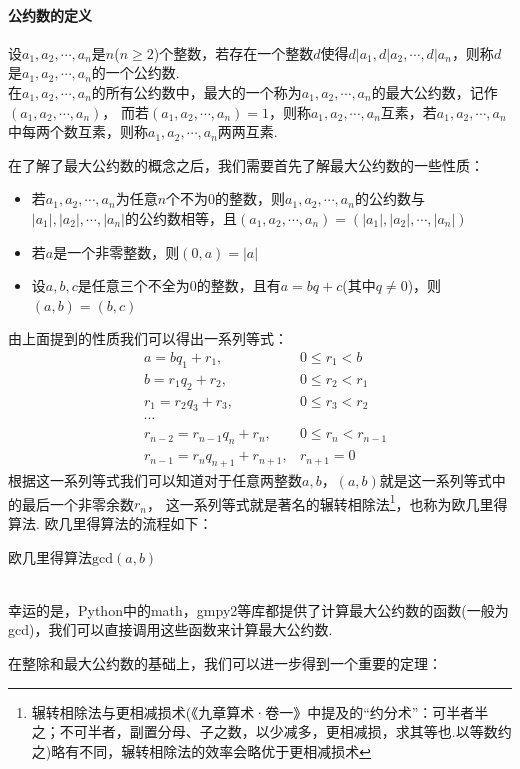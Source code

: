 \documentclass{book}
\numberwithin{equation}{subsubsection}
\begin{document}
\paragraph{\textbf{公约数的定义}}
设$a_1, a_2,\cdots,a_n$是$n$($n\ge2$)个整数，若存在一个整数$d$使得$d|a_1,d|a_2,\cdots,d|a_n$，则称$d$是$a_1,a_2,\cdots,a_n$的一个公约数.\\
在$a_1, a_2,\cdots,a_n$的所有公约数中，最大的一个称为$a_1, a_2,\cdots,a_n$的最大公约数，记作$(a_1,a_2,\cdots,a_n)$，
而若$(a_1,a_2,\cdots,a_n)=1$，则称$a_1, a_2,\cdots,a_n$互素，若$a_1, a_2,\cdots,a_n$中每两个数互素，则称$a_1, a_2,\cdots,a_n$两两互素.\par
在了解了最大公约数的概念之后，我们需要首先了解最大公约数的一些性质：
\begin{itemize}
    \item 若$a_1,a_2,\cdots,a_n$为任意$n$个不为$0$的整数，则$a_1,a_2,\cdots,a_n$的公约数与$|a_1|,|a_2|,\cdots,|a_n|$的公约数相等，且$(a_1,a_2,\cdots,a_n)=(|a_1|,|a_2|,\cdots,|a_n|)$
    \item 若$a$是一个非零整数，则$(0,a)=|a|$
    \item 设$a,b,c$是任意三个不全为$0$的整数，且有$a=bq+c$(其中$q\neq0$)，则$(a,b)=(b,c)$
\end{itemize}
由上面提到的性质我们可以得出一系列等式：
\begin{equation}
\begin{aligned}
    &a=bq_1+r_1,&0\leq r_1 < b\\
    &b=r_1q_2+r_2,&0\leq r_2 < r_1\\
    &r_1=r_2q_3+r_3,&0\leq r_3 < r_2\\
    &\cdots\\
    &r_{n-2}=r_{n-1}q_n+r_n,&0\leq r_n < r_{n-1}\\
    &r_{n-1}=r_nq_{n+1}+r_{n+1},&r_{n+1}=0
\end{aligned}
\end{equation}
根据这一系列等式我们可以知道对于任意两整数$a,b$，$(a,b)$就是这一系列等式中的最后一个非零余数$r_n$，
这一系列等式就是著名的辗转相除法\footnote{辗转相除法与更相减损术(《九章算术·卷一》中提及的“约分术”：可半者半之；不可半者，副置分母、子之数，以少减多，更相减损，求其等也.以等数约之)略有不同，辗转相除法的效率会略优于更相减损术}，也称为欧几里得算法.
欧几里得算法的流程如下：
\begin{algorithm}
    \caption{欧几里得算法$\text{gcd}(a,b)$}
\end{algorithm}\\
幸运的是，Python中的math，gmpy2等库都提供了计算最大公约数的函数(一般为gcd)，我们可以直接调用这些函数来计算最大公约数.\par
在整除和最大公约数的基础上，我们可以进一步得到一个重要的定理：
\end{document}
